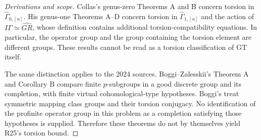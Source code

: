 \begin{proof}[Derivations and scope]
Collas's genus-zero Theorems A and B
\cite{ROOT_CollasZero2012} concern torsion in
$\widehat\Gamma_{0,[n]}$. His genus-one Theorems A--D
\cite{ROOT_CollasOne2012} concern torsion in
$\widehat\Gamma_{1,[n]}$ and the action of
$I\Gamma\simeq\widehat{GR}$, whose definition contains
additional torsion-compatibility equations. In particular,
the operator group and the group containing the torsion
element are different groups. These results cannot be
read as a torsion classification of GT itself.

The same distinction applies to the 2024 sources.
Boggi--Zalesskii's Theorem A and Corollary B
\cite{ROOT_BZ2024} compare finite $p$-subgroups in a
good discrete group and its completion, with finite
virtual cohomological-type hypotheses. Boggi's
\cite[Theorem A, Corollary B and Theorem C]{ROOT_BoggiCSP2024}
treat symmetric mapping class groups and their torsion
conjugacy. No identification of the profinite operator
group in this problem as a completion satisfying those
hypotheses is supplied. Therefore these theorems do
not by themselves yield R25's torsion bound.
\end{proof}


